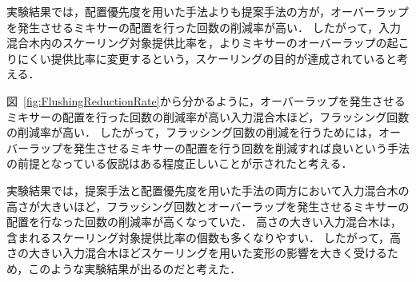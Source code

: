 実験結果では，配置優先度を用いた手法よりも提案手法の方が，オーバーラップを発生させるミキサーの配置を行った回数の削減率が高い．
したがって，入力混合木内のスケーリング対象提供比率を，よりミキサーのオーバーラップの起こりにくい提供比率に変更するという，スケーリングの目的が達成されていると考える．

図~\ref{fig:FlushingReductionRate}から分かるように，オーバーラップを発生させるミキサーの配置を行った回数の削減率が高い入力混合木ほど，フラッシング回数の削減率が高い．
したがって，フラッシング回数の削減を行うためには，オーバーラップを発生させるミキサーの配置を行う回数を削減すれば良いという手法の前提となっている仮説はある程度正しいことが示されたと考える．

実験結果では，提案手法と配置優先度を用いた手法の両方において入力混合木の高さが大きいほど，フラッシング回数とオーバーラップを発生させるミキサーの配置を行なった回数の削減率が高くなっていた．
高さの大きい入力混合木は，含まれるスケーリング対象提供比率の個数も多くなりやすい．
したがって，高さの大きい入力混合木ほどスケーリングを用いた変形の影響を大きく受けるため，このような実験結果が出るのだと考えた．

